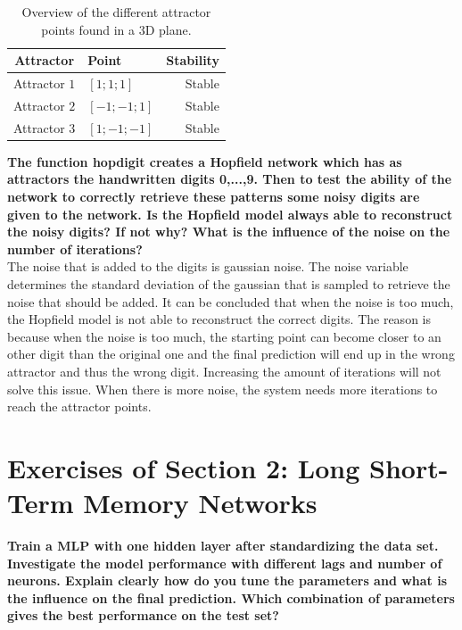 \documentclass[a4paper,10pt]{article}
\begin{document}
\begin{table}
	\centering
	\begin{tabular}{@{}clr@{}} \toprule
		\textbf{Attractor} & \textbf{Point} & \textbf{Stability}\\\midrule
		Attractor $ 1 $ & $ [1;1;1] $ & Stable\\
		Attractor $ 2 $ & $ [-1;-1;1] $ & Stable\\
		Attractor $ 3 $ & $ [1;-1;-1] $ & Stable\\\bottomrule
	\end{tabular}
	\caption{Overview of the different attractor points found in a 3D plane.}
	\label{tab:att3}
\end{table}
\newpage
\textbf{The function hopdigit creates a Hopfield network which has as attractors the handwritten digits 0,...,9. Then to test
	the ability of the network to correctly retrieve these patterns some noisy digits are given to the network. Is the Hopfield
	model always able to reconstruct the noisy digits? If not why? What is the influence of the noise on the number of
	iterations?}\\

The noise that is added to the digits is gaussian noise. The noise variable determines the standard deviation of the gaussian that is sampled to retrieve the noise that should be added. It can be concluded that when the noise is too much, the Hopfield model is not able to reconstruct the correct digits. The reason is because when the noise is too much, the starting point can become closer to an other digit than the original one and the final prediction will end up in the wrong attractor and thus the wrong digit. Increasing the amount of iterations will not solve this issue. When there is more noise, the system needs more iterations to reach the attractor points.

\section{Exercises of Section 2: Long Short-Term Memory Networks}
\textbf{Train a MLP with one hidden layer after standardizing the data set. Investigate the model
performance with different lags and number of neurons. Explain clearly how do you tune the parameters and what is the influence on the final prediction. Which combination of parameters gives the best performance on the test set?}\\
\end{document}
